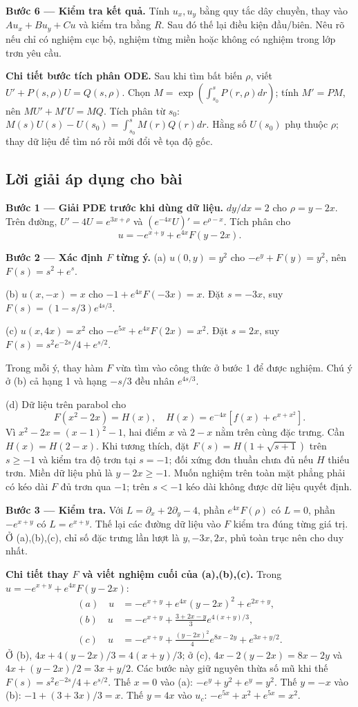 \documentclass[10pt,a4paper]{article}
\begin{document}
\textbf{Bước 6 — Kiểm tra kết quả.} Tính $u_x,u_y$ bằng quy tắc dây chuyền, thay vào $Au_x+Bu_y+Cu$ và kiểm tra bằng $R$. Sau đó thế lại điều kiện đầu/biên. Nêu rõ nếu chỉ có nghiệm cục bộ, nghiệm từng miền hoặc không có nghiệm trong lớp trơn yêu cầu.

\textbf{Chi tiết bước tích phân ODE.} Sau khi tìm bất biến $\rho$, viết $U'+P(s,\rho)U=Q(s,\rho)$. Chọn $M=\exp(\int_{s_0}^{s}P(r,\rho)dr)$; tính $M'=PM$, nên $MU'+M'U=MQ$. Tích phân từ $s_0$: $M(s)U(s)-U(s_0)=\int_{s_0}^sM(r)Q(r)dr$. Hằng số $U(s_0)$ phụ thuộc $\rho$; thay dữ liệu để tìm nó rồi mới đổi về tọa độ gốc.
\subsection*{Lời giải áp dụng cho bài}
\textbf{Bước 1 — Giải PDE trước khi dùng dữ liệu.} $dy/dx=2$ cho $\rho=y-2x$. Trên đường, $U'-4U=e^{3x+\rho}$ và $(e^{-4x}U)'=e^{\rho-x}$. Tích phân cho
\[u=-e^{x+y}+e^{4x}F(y-2x).\]

\textbf{Bước 2 — Xác định $F$ từng ý.}
(a) $u(0,y)=y^2$ cho $-e^y+F(y)=y^2$, nên $F(s)=s^2+e^s$.

(b) $u(x,-x)=x$ cho $-1+e^{4x}F(-3x)=x$. Đặt $s=-3x$, suy $F(s)=(1-s/3)e^{4s/3}$.

(c) $u(x,4x)=x^2$ cho $-e^{5x}+e^{4x}F(2x)=x^2$. Đặt $s=2x$, suy $F(s)=s^2e^{-2s}/4+e^{s/2}$.

Trong mỗi ý, thay hàm $F$ vừa tìm vào công thức ở bước 1 để được nghiệm. Chú ý ở (b) cả hạng 1 và hạng $-s/3$ đều nhân $e^{4s/3}$.

(d) Dữ liệu trên parabol cho
\[F(x^2-2x)=H(x),\quad H(x)=e^{-4x}[f(x)+e^{x+x^2}].\]
Vì $x^2-2x=(x-1)^2-1$, hai điểm $x$ và $2-x$ nằm trên cùng đặc trưng. Cần $H(x)=H(2-x)$. Khi tương thích, đặt $F(s)=H(1+\sqrt{s+1})$ trên $s\ge-1$ và kiểm tra độ trơn tại $s=-1$; đối xứng đơn thuần chưa đủ nếu $H$ thiếu trơn. Miền dữ liệu phủ là $y-2x\ge-1$. Muốn nghiệm trên toàn mặt phẳng phải có kéo dài $F$ đủ trơn qua $-1$; trên $s<-1$ kéo dài không được dữ liệu quyết định.

\textbf{Bước 3 — Kiểm tra.} Với $L=\partial_x+2\partial_y-4$, phần $e^{4x}F(\rho)$ có $L=0$, phần $-e^{x+y}$ có $L=e^{x+y}$. Thế lại các đường dữ liệu vào $F$ kiểm tra đúng từng giá trị. Ở (a),(b),(c), chỉ số đặc trưng lần lượt là $y,-3x,2x$, phủ toàn trục nên cho duy nhất.

\textbf{Chi tiết thay $F$ và viết nghiệm cuối của (a),(b),(c).} Trong $u=-e^{x+y}+e^{4x}F(y-2x)$:
\[\begin{aligned}
(a)\quad u&=-e^{x+y}+e^{4x}(y-2x)^2+e^{2x+y},\\
(b)\quad u&=-e^{x+y}+\frac{3+2x-y}{3}e^{4(x+y)/3},\\
(c)\quad u&=-e^{x+y}+\frac{(y-2x)^2}{4}e^{8x-2y}+e^{3x+y/2}.
\end{aligned}\]
Ở (b), $4x+4(y-2x)/3=4(x+y)/3$; ở (c), $4x-2(y-2x)=8x-2y$ và $4x+(y-2x)/2=3x+y/2$. Các bước này giữ nguyên thừa số mũ khi thế $F(s)=s^2e^{-2s}/4+e^{s/2}$.
Thế $x=0$ vào (a): $-e^y+y^2+e^y=y^2$. Thế $y=-x$ vào (b): $-1+(3+3x)/3=x$. Thế $y=4x$ vào $u_c$: $-e^{5x}+x^2+e^{5x}=x^2$.
\end{document}
